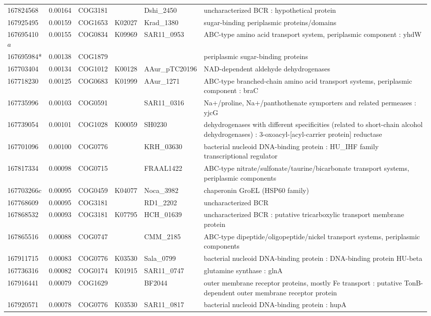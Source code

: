 \begin{landscape}
\begin{longtable}{p{1.8cm}p{0.9cm}p{2.2cm}p{1cm}p{2.8cm}p{13.4cm}}
167824568&0.00164&COG3181&&Dshi\_2450&uncharacterized BCR : hypothetical protein \\
167925495&0.00159&COG1653&K02027&Krad\_1380&sugar-binding periplasmic proteins/domains \\
167695410$a$&0.00155&COG0834&K09969&SAR11\_0953&ABC-type amino acid transport system, periplasmic component : yhdW \\
167695984*&0.00138&COG1879&&&periplasmic sugar-binding proteins \\
167703404&0.00134&COG1012&K00128&AAur\_pTC20196&NAD-dependent aldehyde dehydrogenases \\
167718230&0.00125&COG0683&K01999&AAur\_1271&ABC-type branched-chain amino acid transport systems, periplasmic component : braC \\
167735996&0.00103&COG0591&&SAR11\_0316&Na$+$/proline, Na$+$/panthothenate symporters and related permeases : yjcG \\
167739054&0.00101&COG1028&K00059&SH0230&dehydrogenases with different specificities (related to short-chain alcohol dehydrogenases) : 3-oxoacyl-[acyl-carrier protein] reductase \\
167701096&0.00100&COG0776&&KRH\_03630&bacterial nucleoid DNA-binding protein : HU\_IHF family transcriptional regulator \\
167817334&0.00098&COG0715&&FRAAL1422&ABC-type nitrate/sulfonate/taurine/bicarbonate transport systems, periplasmic components \\
167703266$c$&0.00095&COG0459&K04077&Noca\_3982&chaperonin GroEL (HSP60 family) \\
167768609&0.00095&COG3181&&RD1\_2202&uncharacterized BCR \\
167868532&0.00093&COG3181&K07795&HCH\_01639&uncharacterized BCR : putative tricarboxylic transport membrane protein \\
167865516&0.00088&COG0747&&CMM\_2185&ABC-type dipeptide/oligopeptide/nickel transport systems, periplasmic components \\
167911715&0.00083&COG0776&K03530&Sala\_0799&bacterial nucleoid DNA-binding protein : DNA-binding protein HU-beta \\
167736316&0.00082&COG0174&K01915&SAR11\_0747&glutamine synthase : glnA \\
167916441&0.00079&COG1629&&BF2044&outer membrane receptor proteins, mostly Fe transport : putative TonB-dependent outer membrane receptor protein \\
167920571&0.00078&COG0776&K03530&SAR11\_0817&bacterial nucleoid DNA-binding protein : hupA \\

\end{longtable}
\end{landscape}
